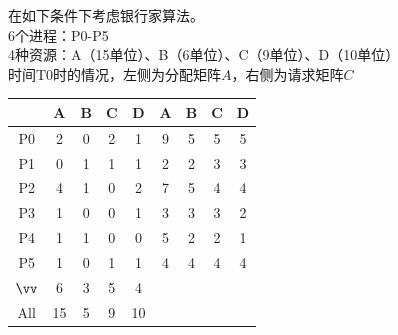 \begin{example}
    在如下条件下考虑银行家算法。\\
    6个进程：P0-P5\\
    4种资源：A（15单位）、B（6单位）、C（9单位）、D（10单位）\\
    时间T0时的情况，左侧为分配矩阵$A$，右侧为请求矩阵$C$
    \begin{center}
        \begin{tabular}{|c|c|c|c|c||c|c|c|c|}\hline
            & A & B & C & D & A & B & C & D\\\hline
            P0 & 2 & 0 & 2 & 1 & 9 & 5 & 5 & 5\\\hline
            P1 & 0 & 1 & 1 & 1 & 2 & 2 & 3 & 3\\\hline
            P2 & 4 & 1 & 0 & 2 & 7 & 5 & 4 & 4\\\hline
            P3 & 1 & 0 & 0 & 1 & 3 & 3 & 3 & 2\\\hline
            P4 & 1 & 1 & 0 & 0 & 5 & 2 & 2 & 1\\\hline
            P5 & 1 & 0 & 1 & 1 & 4 & 4 & 4 & 4\\\hline
            $\vv$ & 6 & 3 & 5 & 4 & & & &\\\hline
            All & 15 & 5 & 9 & 10 & & & &\\\hline
        \end{tabular}
    \end{center}
\end{example}
